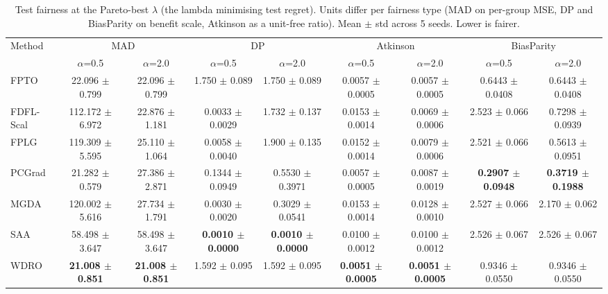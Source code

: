 \begin{table}[t]
\centering
\small
\caption{Test fairness at the Pareto-best $\lambda$ (the lambda minimising test regret). Units differ per fairness type (MAD on per-group MSE, DP and BiasParity on benefit scale, Atkinson as a unit-free ratio). Mean $\pm$ std across 5 seeds. Lower is fairer.}
\label{tab:healthcare_fairness}
\begin{tabular}{lcccccccc}
\toprule
Method & \multicolumn{2}{c}{MAD} & \multicolumn{2}{c}{DP} & \multicolumn{2}{c}{Atkinson} & \multicolumn{2}{c}{BiasParity} \\
 & $\alpha$=0.5 & $\alpha$=2.0 & $\alpha$=0.5 & $\alpha$=2.0 & $\alpha$=0.5 & $\alpha$=2.0 & $\alpha$=0.5 & $\alpha$=2.0 \\
\midrule
FPTO & 22.096 $\pm$ 0.799 & 22.096 $\pm$ 0.799 & 1.750 $\pm$ 0.089 & 1.750 $\pm$ 0.089 & 0.0057 $\pm$ 0.0005 & 0.0057 $\pm$ 0.0005 & 0.6443 $\pm$ 0.0408 & 0.6443 $\pm$ 0.0408 \\
FDFL-Scal & 112.172 $\pm$ 6.972 & 22.876 $\pm$ 1.181 & 0.0033 $\pm$ 0.0029 & 1.732 $\pm$ 0.137 & 0.0153 $\pm$ 0.0014 & 0.0069 $\pm$ 0.0006 & 2.523 $\pm$ 0.066 & 0.7298 $\pm$ 0.0939 \\
FPLG & 119.309 $\pm$ 5.595 & 25.110 $\pm$ 1.064 & 0.0058 $\pm$ 0.0040 & 1.900 $\pm$ 0.135 & 0.0152 $\pm$ 0.0014 & 0.0079 $\pm$ 0.0006 & 2.521 $\pm$ 0.066 & 0.5613 $\pm$ 0.0951 \\
PCGrad & 21.282 $\pm$ 0.579 & 27.386 $\pm$ 2.871 & 0.1344 $\pm$ 0.0949 & 0.5530 $\pm$ 0.3971 & 0.0057 $\pm$ 0.0005 & 0.0087 $\pm$ 0.0019 & \textbf{0.2907 $\pm$ 0.0948} & \textbf{0.3719 $\pm$ 0.1988} \\
MGDA & 120.002 $\pm$ 5.616 & 27.734 $\pm$ 1.791 & 0.0030 $\pm$ 0.0020 & 0.3029 $\pm$ 0.0541 & 0.0153 $\pm$ 0.0014 & 0.0128 $\pm$ 0.0010 & 2.527 $\pm$ 0.066 & 2.170 $\pm$ 0.062 \\
SAA & 58.498 $\pm$ 3.647 & 58.498 $\pm$ 3.647 & \textbf{0.0010 $\pm$ 0.0000} & \textbf{0.0010 $\pm$ 0.0000} & 0.0100 $\pm$ 0.0012 & 0.0100 $\pm$ 0.0012 & 2.526 $\pm$ 0.067 & 2.526 $\pm$ 0.067 \\
WDRO & \textbf{21.008 $\pm$ 0.851} & \textbf{21.008 $\pm$ 0.851} & 1.592 $\pm$ 0.095 & 1.592 $\pm$ 0.095 & \textbf{0.0051 $\pm$ 0.0005} & \textbf{0.0051 $\pm$ 0.0005} & 0.9346 $\pm$ 0.0550 & 0.9346 $\pm$ 0.0550 \\
\bottomrule
\end{tabular}
\end{table}
